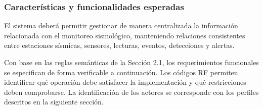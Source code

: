\documentclass[12pt,a4paper]{article}
\begin{document}

\subsubsection{Características y funcionalidades esperadas}

El sistema deberá permitir gestionar de manera centralizada la información relacionada con el monitoreo sismológico, manteniendo relaciones consistentes entre estaciones sísmicas, sensores, lecturas, eventos, detecciones y alertas.

Con base en las reglas semánticas de la Sección 2.1, los requerimientos funcionales se especifican de forma verificable a continuación. Los códigos RF permiten identificar qué operación debe satisfacer la implementación y qué restricciones deben comprobarse. La identificación de los actores se corresponde con los perfiles descritos en la siguiente sección.
\end{document}
